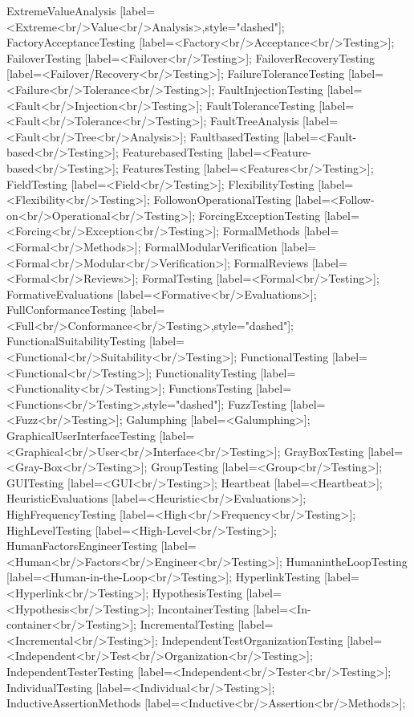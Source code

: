 \documentclass{article}
\begin{document}
{ExtremeValueAnalysis [label=<Extreme<br/>Value<br/>Analysis>,style="dashed"];
FactoryAcceptanceTesting [label=<Factory<br/>Acceptance<br/>Testing>];
FailoverTesting [label=<Failover<br/>Testing>];
FailoverRecoveryTesting [label=<Failover/Recovery<br/>Testing>];
FailureToleranceTesting [label=<Failure<br/>Tolerance<br/>Testing>];
FaultInjectionTesting [label=<Fault<br/>Injection<br/>Testing>];
FaultToleranceTesting [label=<Fault<br/>Tolerance<br/>Testing>];
FaultTreeAnalysis [label=<Fault<br/>Tree<br/>Analysis>];
FaultbasedTesting [label=<Fault-based<br/>Testing>];
FeaturebasedTesting [label=<Feature-based<br/>Testing>];
FeaturesTesting [label=<Features<br/>Testing>];
FieldTesting [label=<Field<br/>Testing>];
FlexibilityTesting [label=<Flexibility<br/>Testing>];
FollowonOperationalTesting [label=<Follow-on<br/>Operational<br/>Testing>];
ForcingExceptionTesting [label=<Forcing<br/>Exception<br/>Testing>];
FormalMethods [label=<Formal<br/>Methods>];
FormalModularVerification [label=<Formal<br/>Modular<br/>Verification>];
FormalReviews [label=<Formal<br/>Reviews>];
FormalTesting [label=<Formal<br/>Testing>];
FormativeEvaluations [label=<Formative<br/>Evaluations>];
FullConformanceTesting [label=<Full<br/>Conformance<br/>Testing>,style="dashed"];
FunctionalSuitabilityTesting [label=<Functional<br/>Suitability<br/>Testing>];
FunctionalTesting [label=<Functional<br/>Testing>];
FunctionalityTesting [label=<Functionality<br/>Testing>];
FunctionsTesting [label=<Functions<br/>Testing>,style="dashed"];
FuzzTesting [label=<Fuzz<br/>Testing>];
Galumphing [label=<Galumphing>];
GraphicalUserInterfaceTesting [label=<Graphical<br/>User<br/>Interface<br/>Testing>];
GrayBoxTesting [label=<Gray-Box<br/>Testing>];
GroupTesting [label=<Group<br/>Testing>];
GUITesting [label=<GUI<br/>Testing>];
Heartbeat [label=<Heartbeat>];
HeuristicEvaluations [label=<Heuristic<br/>Evaluations>];
HighFrequencyTesting [label=<High<br/>Frequency<br/>Testing>];
HighLevelTesting [label=<High-Level<br/>Testing>];
HumanFactorsEngineerTesting [label=<Human<br/>Factors<br/>Engineer<br/>Testing>];
HumanintheLoopTesting [label=<Human-in-the-Loop<br/>Testing>];
HyperlinkTesting [label=<Hyperlink<br/>Testing>];
HypothesisTesting [label=<Hypothesis<br/>Testing>];
IncontainerTesting [label=<In-container<br/>Testing>];
IncrementalTesting [label=<Incremental<br/>Testing>];
IndependentTestOrganizationTesting [label=<Independent<br/>Test<br/>Organization<br/>Testing>];
IndependentTesterTesting [label=<Independent<br/>Tester<br/>Testing>];
IndividualTesting [label=<Individual<br/>Testing>];
InductiveAssertionMethods [label=<Inductive<br/>Assertion<br/>Methods>];
}
\end{document}
